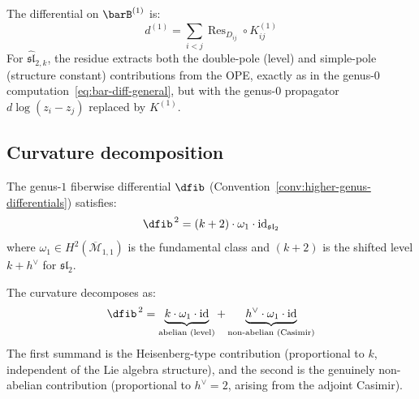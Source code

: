 The differential on $\barB^{(1)}$ is:
\begin{equation}\label{eq:genus1-diff}
d^{(1)} = \sum_{i<j} \operatorname{Res}_{D_{ij}} \circ K^{(1)}_{ij}
\end{equation}
For $\widehat{\mathfrak{sl}}_{2,k}$, the residue extracts both the double-pole (level) and simple-pole (structure constant) contributions from the OPE, exactly as in the genus-0 computation~\eqref{eq:bar-diff-general}, but with the genus-0 propagator $d\log(z_i-z_j)$ replaced by $K^{(1)}$.

\subsection{Curvature decomposition}

\begin{theorem}
\label{thm:sl2-genus1-curvature}
The genus-$1$ fiberwise differential
$\dfib$ \textup{(}Convention~\textup{\ref{conv:higher-genus-differentials})} satisfies:
\begin{equation}\label{eq:sl2-genus1-dsquared}
\dfib^{\,2} = (k+2) \cdot \omega_1 \cdot \operatorname{id}_{\mathfrak{sl}_2}
\end{equation}
where $\omega_1 \in H^2(\overline{\mathcal{M}}_{1,1})$ is the fundamental class and $(k+2)$ is the shifted level $k + h^\vee$ for $\mathfrak{sl}_2$.

The curvature decomposes as:
\begin{equation}\label{eq:curvature-decomposition}
\dfib^{\,2} = \underbrace{k \cdot \omega_1 \cdot \operatorname{id}}_{\text{abelian (level)}} + \underbrace{h^\vee \cdot \omega_1 \cdot \operatorname{id}}_{\text{non-abelian (Casimir)}}
\end{equation}
The first summand is the Heisenberg-type contribution (proportional to $k$, independent of the Lie algebra structure), and the second is the genuinely non-abelian contribution (proportional to $h^\vee=2$, arising from the adjoint Casimir).
\end{theorem}

